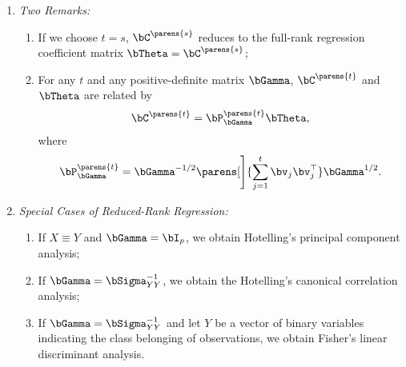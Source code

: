\documentclass[12pt]{article}
\begin{document}
\begin{enumerate}[label=\textbf{\arabic*.}]
\begin{enumerate}
		\item \textit{Two Remarks:} 
		\begin{enumerate}
			\item If we choose $t = s$, $\bC^{\parens{s}}$ reduces to the full-rank regression coefficient matrix $\bTheta = \bC^{\parens{s}}$; 
			\item For any $t$ and any positive-definite matrix $\bGamma$, $\bC^{\parens{t}}$ and $\bTheta$ are related by 
			\begin{align*}
				\bC^{\parens{t}} = \bP_{\bGamma}^{\parens{t}} \bTheta, 
			\end{align*}
			where 
			\begin{align*}
				\bP_{\bGamma}^{\parens{t}} = \bGamma^{-1/2} \parens[\Bigg]{\sum_{j=1}^t \bv_j \bv_j^\top} \bGamma^{1/2}. 
			\end{align*}
		\end{enumerate}
		
		\item \textit{Special Cases of Reduced-Rank Regression:}
		\begin{enumerate}
			\item If $X \equiv Y$ and $\bGamma = \bI_p$, we obtain Hotelling's principal component analysis; 
			\item If $\bGamma = \bSigma_{YY}^{-1}$, we obtain the Hotelling's canonical correlation analysis; 
			\item If $\bGamma = \bSigma_{YY}^{-1}$ and let $Y$ be a vector of binary variables indicating the class belonging of observations, we obtain Fisher's linear discriminant analysis. 
		\end{enumerate}
		

\end{enumerate}
\end{enumerate}
\end{document}
